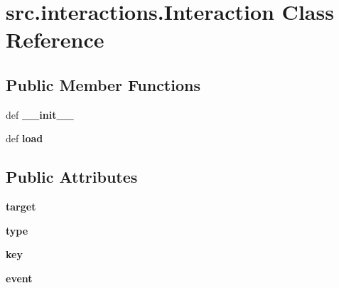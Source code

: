 \hypertarget{classsrc_1_1interactions_1_1_interaction}{\section{src.\-interactions.\-Interaction \-Class \-Reference}
\label{classsrc_1_1interactions_1_1_interaction}
}
\subsection*{\-Public \-Member \-Functions}
\begin{DoxyCompactItemize}
\item 
\hypertarget{classsrc_1_1interactions_1_1_interaction_a97a1759e258a88c8b6e31e1afde852b9}{def {\bfseries \-\_\-\-\_\-init\-\_\-\-\_\-}}\label{classsrc_1_1interactions_1_1_interaction_a97a1759e258a88c8b6e31e1afde852b9}

\item 
\hypertarget{classsrc_1_1interactions_1_1_interaction_a96ccab0afe3e927e94f5c39fe1b59cfc}{def {\bfseries load}}\label{classsrc_1_1interactions_1_1_interaction_a96ccab0afe3e927e94f5c39fe1b59cfc}

\end{DoxyCompactItemize}
\subsection*{\-Public \-Attributes}
\begin{DoxyCompactItemize}
\item 
\hypertarget{classsrc_1_1interactions_1_1_interaction_ad577ad6550f3bad2cf45192bcdd2d659}{{\bfseries target}}\label{classsrc_1_1interactions_1_1_interaction_ad577ad6550f3bad2cf45192bcdd2d659}

\item 
\hypertarget{classsrc_1_1interactions_1_1_interaction_a455988c49a2625914d11e97e0b1b9285}{{\bfseries type}}\label{classsrc_1_1interactions_1_1_interaction_a455988c49a2625914d11e97e0b1b9285}

\item 
\hypertarget{classsrc_1_1interactions_1_1_interaction_ae0115c68842371d5c28d85f2234c9d4b}{{\bfseries key}}\label{classsrc_1_1interactions_1_1_interaction_ae0115c68842371d5c28d85f2234c9d4b}

\item 
\hypertarget{classsrc_1_1interactions_1_1_interaction_aec1ad3a52431ab38496a0ce83a21b7f1}{{\bfseries event}}\label{classsrc_1_1interactions_1_1_interaction_aec1ad3a52431ab38496a0ce83a21b7f1}

\end{DoxyCompactItemize}


